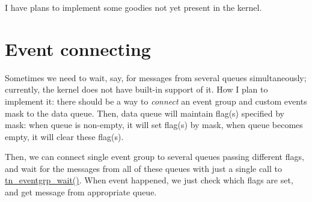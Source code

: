 I have plans to implement some goodies not yet present in the kernel.\hypertarget{plans_plans_event_connect}{}\section{Event connecting}\label{plans_plans_event_connect}
Sometimes we need to wait, say, for messages from several queues simultaneously; currently, the kernel does not have built-\/in support of it. How I plan to implement it\+: there should be a way to {\itshape connect} an event group and custom events mask to the data queue. Then, data queue will maintain flag(s) specified by mask\+: when queue is non-\/empty, it will set flag(s) by mask, when queue becomes empty, it will clear these flag(s).

Then, we can connect single event group to several queues passing different flags, and wait for the messages from all of these queues with just a single call to {\ttfamily \hyperlink{tn__eventgrp_8h_aee53d0c38f050ee6eecbdce19548b157}{tn\+\_\+eventgrp\+\_\+wait()}}. When event happened, we just check which flags are set, and get message from appropriate queue. 